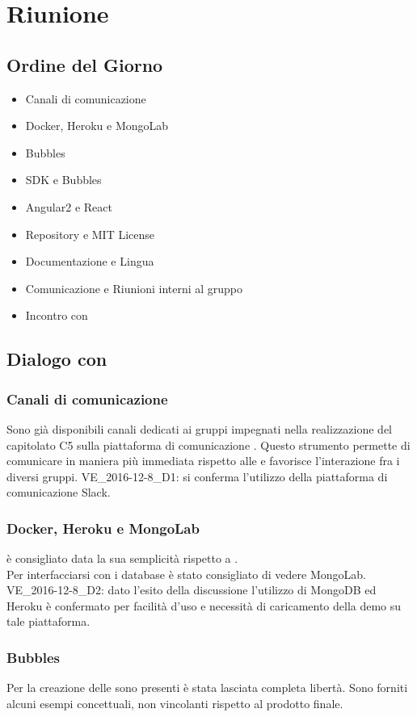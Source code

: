 \section{Riunione}
\subsection{Ordine del Giorno}
\begin{itemize}
	\item Canali di comunicazione
	\item Docker, Heroku e MongoLab
	\item Bubbles
	\item SDK e Bubbles
	\item Angular2 e React
	\item Repository e MIT License
	\item Documentazione e Lingua
	\item Comunicazione e Riunioni interni al gruppo \GroupName{}
	\item Incontro con \Proponente{}	
\end{itemize}

\subsection{Dialogo con \Proponente}
\subsubsection{Canali di comunicazione}
Sono già disponibili canali dedicati ai gruppi impegnati nella realizzazione del capitolato C5 sulla piattaforma di comunicazione . Questo strumento permette di comunicare in maniera più immediata rispetto alle \email{} e favorisce l'interazione fra i diversi gruppi. VE_2016-12-8_D1: si conferma l'utilizzo della piattaforma di comunicazione Slack.

\subsubsection{Docker, Heroku e MongoLab}
 è consigliato data la sua semplicità rispetto a .\\ 
Per interfacciarsi con i database è stato consigliato di vedere MongoLab.
VE_2016-12-8_D2: dato l'esito della discussione l'utilizzo di MongoDB ed Heroku è confermato per facilità d'uso e necessità di caricamento della demo su tale piattaforma. 

\subsubsection{Bubbles}
Per la creazione delle  sono presenti è stata lasciata completa libertà. Sono forniti alcuni esempi concettuali, non vincolanti rispetto al prodotto finale.

